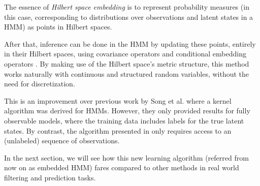 The essence of \textit{Hilbert space embedding} is to represent probability measures (in this case, corresponding to distributions over observations and latent states in a HMM) as points in Hilbert spaces. 

After that, inference can be done in the HMM by updating these points, entirely in their Hilbert spaces, using covariance operators \cite{ref23} and conditional
embedding operators \cite{ref24}. By making use of the Hilbert space’s metric structure, this method works naturally with continuous and structured
random variables, without the need for discretization.

This is an improvement over previous work by Song et al.\cite{ref24} where a kernel algorithm was derived for HMMs. However, they only provided results for fully observable models, where the training data includes labels
for the true latent states. By contrast, the algorithm presented in \cite{ref20} only requires access to an (unlabeled) sequence of observations.

In the next section, we will see how this new learning algorithm (referred from now on as embedded HMM) fares compared to other methods in real world filtering and prediction tasks.